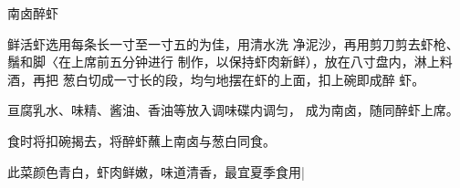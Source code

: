 \begin{recipe}{南卤醉虾}

\ingredients


\cooking

\step 	鲜活虾选用每条长一寸至一寸五的为佳，用清水洗 净泥沙，再用剪刀剪去虾枪、鬚和脚〈在上席前五分钟进行 制作，以保持虾肉新鲜），放在八寸盘内，淋上料酒，再把 葱白切成一寸长的段，均勻地摆在虾的上面，扣上碗即成醉 虾。

\step 	亘腐乳水、味精、酱油、香油等放入调味碟内调匀， 成为南卤，随同醉虾上席。

\step 食时将扣碗揭去，将醉虾蘸上南卤与葱白同食。

\notes

此菜颜色青白，虾肉鲜嫩，味道清香，最宜夏季食用|

\end{recipe}


